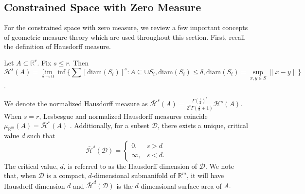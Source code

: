 \documentclass[10pt,fleqn]{article}
\newcommand{\bb}[1]{\mathbb{#1}} \newcommand{\mc}[1]{\mathcal{#1}}
\DeclareMathOperator{\1}{\mathbbm{1}} \DeclareMathOperator{\bigO}{\mc O}
\begin{document}
\subsection{Constrained Space with Zero Measure}
\label{SEC:Zero_measure_theory}

For the constrained space with zero measure, we review a few important concepts of
geometric measure theory which are used throughout this section.  First,
recall the definition of Hausdorff measure.  \begin{Hausdorff_def} Let
$A\subset \bb R^r$. Fix $s \le r$. Then $$\mc H^{s}(A)=
\underset{\delta\rightarrow 0}\lim \inf \bigg\{ \sum
\left[{\text{diam}(S_i)}\right]^s: {A\subseteq \cup S_i,
\text{diam}(S_i)\le \delta}, \text{diam}(S_i)=\sup_{x,y\in
S}\|x-y\|\bigg\}$$.  \end{Hausdorff_def} We denote the normalized Hausdorff
measure as $\bar{\mc H}^{s}(A) =\frac{\Gamma(\frac{1}{2})^{s}}{2^s
\Gamma(\frac{s}{2}+1)} \mc H^{s}(A)$. When $s=r$, Lesbesgue and normalized
Hausdorff measures coincide  $\mu_{\mathbb{R}^m}(A)= \bar{\mc H}^{s}(A)$
\citep{evans2015measure}.  Additionally, for a subset $\mathcal{D}$, there
exists a unique, critical value $d$ such that
$$\bar{\mathcal{H}}^s(\mathcal{D}) = \begin{cases} 0, & s > d \\ \infty, &
s < d.\end{cases}$$ The critical value, $d$, is referred to as the
Hausdorff dimension of $\mathcal{D}$. We note that, when $\mathcal{D}$ is a
compact, $d$-dimensional submanifold of $\mathbb{R}^m$, it will have
Hausdorff dimension $d$ and $\bar{\mathcal{H}}^d(\mathcal{D})$ is the
$d$-dimensional surface area of $A.$
\end{document}
